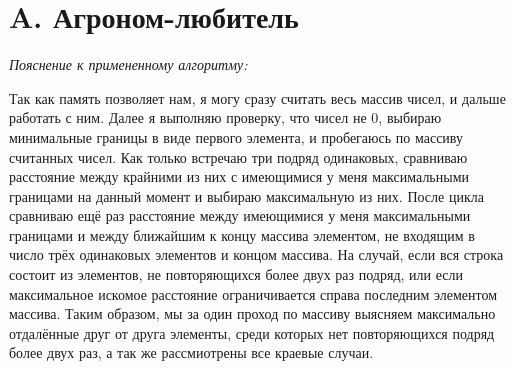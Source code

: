 \section{A. Агроном-любитель}
\textit{Пояснение к примененному алгоритму:} \par
Так как память позволяет нам, я могу сразу считать весь массив чисел, и дальше работать с ним.
Далее я выполняю проверку, что чисел не 0, выбираю минимальные границы в виде первого элемента, и пробегаюсь по массиву считанных чисел.
Как только встречаю три подряд одинаковых, сравниваю расстояние между крайними из них с имеющимися у меня максимальными границами на данный момент и выбираю максимальную из них.
После цикла сравниваю ещё раз расстояние между имеющимися у меня максимальными границами и между ближайшим к концу массива элементом, не входящим в число трёх одинаковых элементов и концом массива.
На случай, если вся строка состоит из элементов, не повторяющихся более двух раз подряд, или если максимальное искомое расстояние ограничивается справа последним элементом массива.
Таким образом, мы за один проход по массиву выясняем максимально отдалённые друг от друга элементы, среди которых нет повторяющихся подряд более двух раз, а так же рассмиотрены все краевые случаи.
\BgThispage
\newpage

